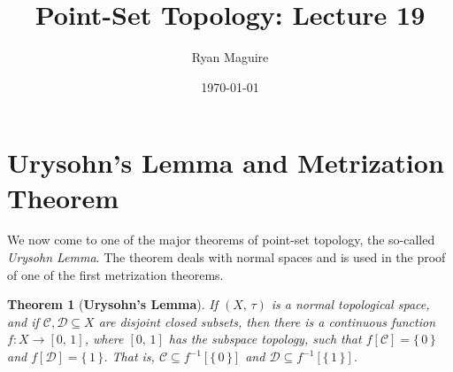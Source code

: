\documentclass{article}
\title{Point-Set Topology: Lecture 19}
\author{Ryan Maguire}
\date{\today}
\theoremstyle{plain}
\newtheorem{theorem}{Theorem}[section]
\begin{document}
    \maketitle
    \section{Urysohn's Lemma and Metrization Theorem}
        We now come to one of the major theorems of point-set topology, the
        so-called \textit{Urysohn Lemma}. The theorem deals with normal spaces
        and is used in the proof of one of the first metrization theorems.
        \begin{theorem}[\textbf{Urysohn's Lemma}]
            If $(X,\,\tau)$ is a normal topological space, and if
            $\mathcal{C},\mathcal{D}\subseteq{X}$ are disjoint closed subsets,
            then there is a continuous function
            $f:X\rightarrow[0,\,1]$, where $[0,\,1]$ has the subspace topology,
            such that $f[\mathcal{C}]=\{\,0\,\}$ and
            $f[\mathcal{D}]=\{\,1\,\}$. That is,
            $\mathcal{C}\subseteq{f}^{-1}[\{\,0\,\}]$ and
            $\mathcal{D}\subseteq{f}^{-1}[\{\,1\,\}]$.
        \end{theorem}
\end{document}
